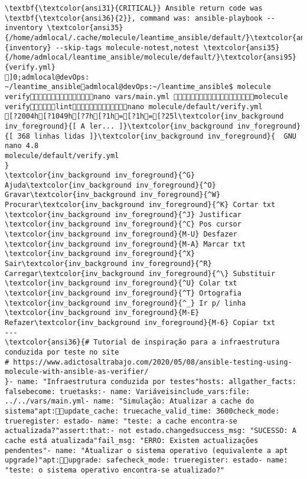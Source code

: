 \documentclass{scrartcl}
\begin{document}
\begin{Verbatim}
\textbf{\textcolor{ansi31}{CRITICAL}} Ansible return code was \textbf{\textcolor{ansi36}{2}}, command was: ansible-playbook --inventory \textcolor{ansi35}{/home/admlocal/.cache/molecule/leantime_ansible/default/}\textcolor{ansi95}{inventory} --skip-tags molecule-notest,notest \textcolor{ansi35}{/home/admlocal/leantime_ansible/molecule/default/}\textcolor{ansi95}{verify.yml}
]0;admlocal@devOps: ~/leantime_ansibleadmlocal@devOps:~/leantime_ansible$ molecule verifynano vars/main.yml molecule verifylintnano molecule/default/verify.yml 
[?2004h[?1049h[?7h[?1h=[?1h=[?25l\textcolor{inv_background inv_foreground}{[ A ler... ]}\textcolor{inv_background inv_foreground}{[ 368 linhas lidas ]}\textcolor{inv_background inv_foreground}{  GNU nano 4.8                                          molecule/default/verify.yml                                                       }
\textcolor{inv_background inv_foreground}{^G} Ajuda\textcolor{inv_background inv_foreground}{^O} Gravar\textcolor{inv_background inv_foreground}{^W} Procurar\textcolor{inv_background inv_foreground}{^K} Cortar txt    \textcolor{inv_background inv_foreground}{^J} Justificar    \textcolor{inv_background inv_foreground}{^C} Pos cursor    \textcolor{inv_background inv_foreground}{M-U} Desfazer     \textcolor{inv_background inv_foreground}{M-A} Marcar txt
\textcolor{inv_background inv_foreground}{^X} Sair\textcolor{inv_background inv_foreground}{^R} Carregar\textcolor{inv_background inv_foreground}{^\} Substituir    \textcolor{inv_background inv_foreground}{^U} Colar txt     \textcolor{inv_background inv_foreground}{^T} Ortografia    \textcolor{inv_background inv_foreground}{^_} Ir p/ linha   \textcolor{inv_background inv_foreground}{M-E} Refazer\textcolor{inv_background inv_foreground}{M-6} Copiar txt
---
\textcolor{ansi36}{# Tutorial de inspiração para a infraestrutura conduzida por teste no site
# https://www.adictosaltrabajo.com/2020/05/08/ansible-testing-using-molecule-with-ansible-as-verifier/
}- name: "Infraestrutura conduzida por testes"hosts: allgather_facts: falsebecome: truetasks:- name: Variáveisinclude_vars:file: ../../vars/main.yml- name: "Simulação: Atualizar a cache do sistema"apt:update_cache: truecache_valid_time: 3600check_mode: trueregister: estado- name: "teste: a cache encontra-se actualizada?"assert:that:- not estado.changedsuccess_msg: "SUCESSO: A cache está atualizada"fail_msg: "ERRO: Existem actualizações pendentes"- name: "Atualizar o sistema operativo (equivalente a apt upgrade)"apt:upgrade: safecheck_mode: trueregister: estado- name: "teste: o sistema operativo encontra-se atualizado?"

\end{Verbatim}
\end{document}
